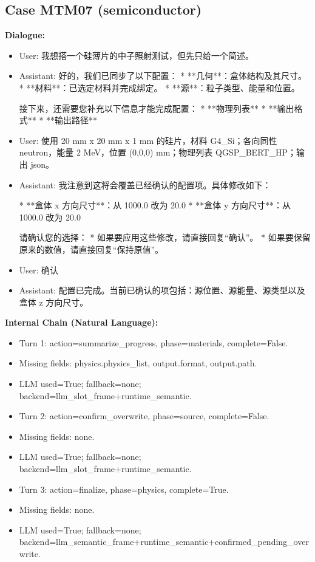 \documentclass[11pt]{ctexart}
\begin{document}
\subsection{Case MTM07 (semiconductor)}
\textbf{Dialogue:}
\begin{itemize}
\item User: 我想搭一个硅薄片的中子照射测试，但先只给一个简述。
\item Assistant: 好的，我们已同步了以下配置：
*   **几何**：盒体结构及其尺寸。
*   **材料**：已选定材料并完成绑定。
*   **源**：粒子类型、能量和位置。

接下来，还需要您补充以下信息才能完成配置：
*   **物理列表**
*   **输出格式**
*   **输出路径**
\item User: 使用 20 mm x 20 mm x 1 mm 的硅片，材料 G4\_Si；各向同性 neutron，能量 2 MeV，位置 (0,0,0) mm；物理列表 QGSP\_BERT\_HP；输出 json。
\item Assistant: 我注意到这将会覆盖已经确认的配置项。具体修改如下：

*   **盒体 x 方向尺寸**：从 1000.0 改为 20.0
*   **盒体 y 方向尺寸**：从 1000.0 改为 20.0

请确认您的选择：
*   如果要应用这些修改，请直接回复“确认”。
*   如果要保留原来的数值，请直接回复“保持原值”。
\item User: 确认
\item Assistant: 配置已完成。当前已确认的项包括：源位置、源能量、源类型以及盒体 z 方向尺寸。
\end{itemize}
\textbf{Internal Chain (Natural Language):}
\begin{itemize}
\item Turn 1: action=summarize\_progress, phase=materials, complete=False.
\item Missing fields: physics.physics\_list, output.format, output.path.
\item LLM used=True; fallback=none; backend=llm\_slot\_frame+runtime\_semantic.
\item Turn 2: action=confirm\_overwrite, phase=source, complete=False.
\item Missing fields: none.
\item LLM used=True; fallback=none; backend=llm\_slot\_frame+runtime\_semantic.
\item Turn 3: action=finalize, phase=physics, complete=True.
\item Missing fields: none.
\item LLM used=True; fallback=none; backend=llm\_semantic\_frame+runtime\_semantic+confirmed\_pending\_overwrite.
\end{itemize}
\end{document}
